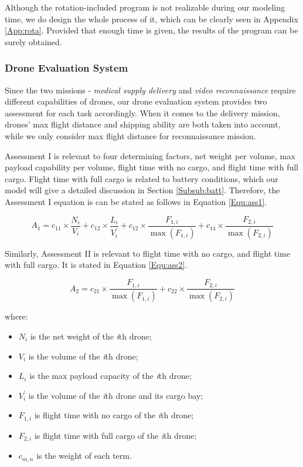 \documentclass{mcmthesis}
\begin{document}
\newpage
Although the rotation-included program is not realizable during our modeling time, we do design the whole process of it, which can be clearly seen in Appendix \ref{App:rota}. Provided that enough time is given, the results of the program can be surely obtained.

\clearpage

\subsubsection{Drone Evaluation System}

Since the two missions - \emph{medical supply delivery} and \emph{video reconnaissance} require different capabilities of drones, our drone evaluation system provides two assessment for each task accordingly. When it comes to the delivery mission, drones' max flight distance and shipping ability are both taken into account, while we only consider max flight distance for reconnaissance mission. 

Assessment I is relevant to four determining factors, net weight per volume, max payload capability per volume, flight time with no cargo, and flight time with full cargo. Flight time with full cargo is related to battery conditions, which our model will give a detailed discussion in Section \ref{Subsub:batt}. Therefore, the Assessment I equation is can be stated as follows in Equation \eqref{Equ:ass1}.

\begin{equation}\label{Equ:ass1}
    A_1 = c_{11}\times\frac{N_i}{V_i} + c_{12}\times\frac{L_i}{V_i^{'}} + c_{12}\times\frac{F_{1,i}}{\max  \left(F_{1,i}\right)} + c_{14}\times\frac{F_{2,i}}{\max \left(F_{2,i}\right)}
\end{equation}

Similarly, Assessment II is relevant to flight time with no cargo, and flight time with full cargo. It is stated in Equation \eqref{Equ:ass2}.

\begin{equation}\label{Equ:ass2}
    A_2 = c_{21}\times\frac{F_{1,i}}{\max  \left(F_{1,i}\right)} + c_{22}\times\frac{F_{2,i}}{\max \left(F_{2,i}\right)}
\end{equation}

where:
\begin{itemize}
    \item $N_i$ is the net weight of the \emph{i}th drone;
    \item $V_i$ is the volume of the \emph{i}th drone;
    \item $L_i$ is the max payload capacity of the \emph{i}th drone;
    \item $V_i^{'}$ is the volume of the \emph{i}th drone and its cargo bay;
    \item $F_{1,i}$ is flight time with no cargo of the \emph{i}th drone;
    \item $F_{2,i}$ is flight time with full cargo of the \emph{i}th drone;
    \item $c_{m,n}$ is the weight of each term.
\end{itemize}
\end{document}
